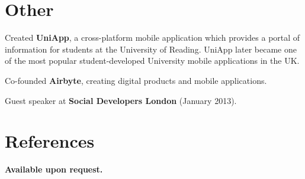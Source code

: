 \documentclass[margin,line,a4paper]{resume}
\begin{document}
\begin{resume}

    	\section{\mysidestyle Other}

	\begin{list2}
		\item Created \textbf{UniApp}, a cross-platform mobile application which provides a portal of information for students at the University of Reading. UniApp later became one of the most popular student-developed University mobile applications in the UK.
		\item Co-founded \textbf{Airbyte}, creating digital products and mobile applications.
		\item Guest speaker at \textbf{Social Developers London} (January 2013).
	\end{list2}

 	

	\section{\mysidestyle References}
	
	\textbf{Available upon request.}\vspace{1mm}\\%

\end{resume}
\end{document}

